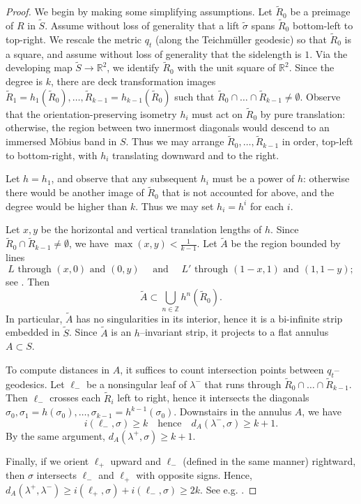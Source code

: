 \documentclass[11pt,letterpaper]{amsart}
\newcommand{\RR}[0]{\mathbb{R}}
\newcommand{\ZZ}[0]{\mathbb{Z}}
\newcommand{\wt}{\widetilde}
\numberwithin{equation}{section}
\theoremstyle{definition}
\begin{document}
\begin{proof}
We begin by making some simplifying assumptions. Let $\wt R_0$ be a preimage of $R$ in $\widetilde S$. 
Assume without loss of generality that a lift $\wt \sigma$ spans $\wt R_0$ bottom-left to top-right. We rescale the metric $q_t$ (along the Teichm\"uller geodesic) so that $\wt R_0$ is a square, and assume without loss of generality that the sidelength is $1$. Via the developing map $\widetilde S \to \RR^2$, we identify $\wt R_0$ with the unit square of $\RR^2$.
Since the degree is $k$, there are deck transformation images $\wt R_1 = h_1(\wt R_0), \ldots, \wt R_{k-1} = h_{k-1}(\wt R_0)$ such that $\wt R_0 \cap \dots \cap \wt R_{k-1} \neq \emptyset$.
Observe that the orientation-preserving isometry $h_i$ must act on $\wt R_0$ by pure translation: 
 otherwise, the region between two innermost diagonals would descend to an immersed M\"obius band in $S$.
 Thus we may arrange $\wt R_0, \ldots, \wt R_{k-1}$ in order, top-left to bottom-right, with $h_i$ translating downward and to the right. 

Let $h = h_1$, and observe that any subsequent $h_i$ must be a power of $h$: otherwise there would be another image of $\wt R_0$ that is not accounted for above, and the degree would be higher than $k$. Thus we may set $h_i = h^i$ for each $i$.

Let $x,y$ be the horizontal and vertical translation lengths of $h$. Since $\wt R_0 \cap \wt R_{k-1} \neq \emptyset$, we have $\max(x,y) < \frac{1}{k-1}$. Let $\widetilde A$ be the region bounded by lines
\[
L \text{ through $(x,0)$ and $(0,y)$}  \quad \text{ and } \quad L' \text{ through $(1-x,1)$ and $(1,1-y)$};
\]
see .
Then
\[
\widetilde A \subset \bigcup_{n \in \ZZ} h^n (\wt R_0).
\]
In particular, $\widetilde A$ has no singularities in its interior, hence it is a bi-infinite strip embedded in $\widetilde S$.
Since $\widetilde A$ is an $h$--invariant strip, it projects to a flat annulus $A \subset S$.



To compute distances in $A$, it suffices to count intersection points between $q_t$--geodesics. Let $\ell_-$ be a nonsingular leaf of $\lambda^-$ that runs through $\wt R_0 \cap \ldots \cap \wt R_{k-1}$. Then $\ell_-$ crosses each $\wt R_i$ left to right, hence it intersects the diagonals $\sigma_0, \sigma_1 = h(\sigma_0), \ldots, \sigma_{k-1} = h^{k-1}(\sigma_0)$. Downstairs in the annulus $A$, we have
\[
i(\ell_-, \sigma) \geq k \quad \text{hence} \quad d_A(\lambda^-, \sigma) \geq k+1.
\]
By the same argument, $d_A(\lambda^+, \sigma) \geq k+1$.

Finally, if we orient $\ell_+$ upward and $\ell_-$ (defined in the same manner) rightward, then $\sigma$ intersects $\ell_-$ and $\ell_+$ with opposite signs. Hence, $d_A(\lambda^+, \lambda^-) \ge i(\ell_+, \sigma) + i(\ell_-, \sigma) \ge 2k$. See e.g. \cite[Equation 2.5]{MasurMinsky2}.
\end{proof}
\end{document}
